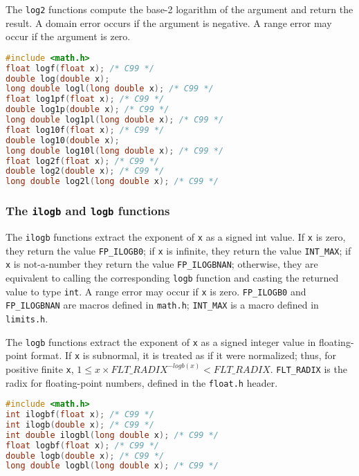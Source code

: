 The \texttt{log2} functions compute the base-2 logarithm of the argument and
return the result. A domain error occurs if the argument is negative. A range
error may occur if the argument is zero.
\lstset{basicstyle=\scriptsize, numbers=left, captionpos=b, tabsize=4}
\begin{lstlisting}[caption=Section \thesection listing \arabic{furthermathcnt},language={C},
breaklines=true,xleftmargin=15pt,label=lst:section\thesection listing\arabic{furthermathcnt}]
#include <math.h>
float logf(float x); /* C99 */
double log(double x);
long double logl(long double x); /* C99 */
float log1pf(float x); /* C99 */
double log1p(double x); /* C99 */
long double log1pl(long double x); /* C99 */
float log10f(float x); /* C99 */
double log10(double x);
long double log10l(long double x); /* C99 */
float log2f(float x); /* C99 */
double log2(double x); /* C99 */
long double log2l(long double x); /* C99 */
\end{lstlisting}

\subsubsection{The \texttt{ilogb} and \texttt{logb} functions}
The \texttt{ilogb} functions extract the exponent of \texttt{x} as a signed int
value. If \texttt{x} is zero, they return the value \texttt{FP\_ILOGB0}; if
\texttt{x} is infinite, they return the value \texttt{INT\_MAX}; if \texttt{x}
is not-a-number they return the value \texttt{FP\_ILOGBNAN}; otherwise, they
are equivalent to calling the corresponding \texttt{logb} function and casting
the returned value to type \texttt{int}. A range error may occur if \texttt{x}
is zero. \texttt{FP\_ILOGB0} and \texttt{FP\_ILOGBNAN} are macros defined in
\texttt{math.h}; \texttt{INT\_MAX} is a macro defined in \texttt{limits.h}.

The \texttt{logb} functions extract the exponent of \texttt{x} as a signed
integer value in floating-point format. If \texttt{x} is subnormal, it is
treated as if it were normalized; thus, for positive finite \texttt{x},
$1 \leq x \times FLT\_RADIX^{-logb(x)} < FLT\_RADIX$.
\texttt{FLT\_RADIX} is the radix for floating-point numbers, defined in the
\texttt{float.h} header.
\lstset{basicstyle=\scriptsize, numbers=left, captionpos=b, tabsize=4}
\begin{lstlisting}[caption=Section \thesection listing \arabic{furthermathcnt},language={C},
breaklines=true,xleftmargin=15pt, label=lst:section\thesection listing\arabic{furthermathcnt}]
#include <math.h>
int ilogbf(float x); /* C99 */
int ilogb(double x); /* C99 */
int double ilogbl(long double x); /* C99 */
float logbf(float x); /* C99 */
double logb(double x); /* C99 */
long double logbl(long double x); /* C99 */
\end{lstlisting}

